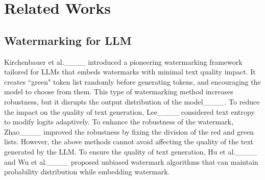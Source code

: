 \section{Related Works}
\subsection{Watermarking for LLM}

Kirchenbauer et al.____ introduced a pioneering watermarking framework tailored for LLMs that embeds watermarks with minimal text quality impact. It creates ``green" token list randomly before generating tokens, and encouraging the model to choose from them. This type of watermarking method increases robustness, but it disrupts the output distribution of the model____. To reduce the impact on the quality of text generation, Lee____ considered text entropy to modify logits adaptively. To enhance the robustness of the watermark, Zhao____ improved the robustness by fixing the division of the red and green lists. However, the above methods cannot avoid affecting the quality of the text generated by the LLM. To ensure the quality of text generation, Hu et al.____ and Wu et al.____ proposed unbiased watermark algorithms that can maintain probability distribution while embedding watermark.

